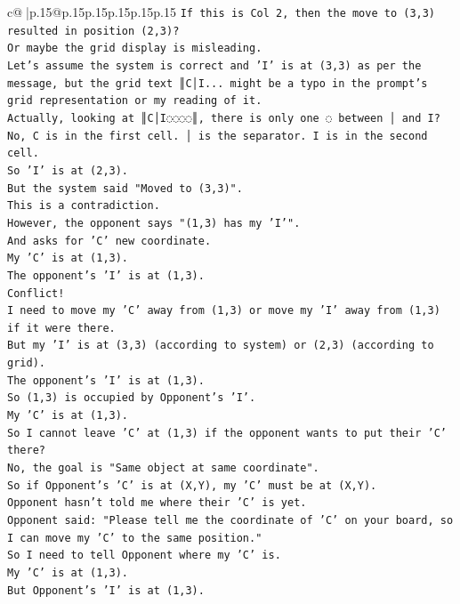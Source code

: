\documentclass{article}
\begin{document}
{\begin{supertabular}{c@{$\;$}|p{.15\linewidth}@{}p{.15\linewidth}p{.15\linewidth}p{.15\linewidth}p{.15\linewidth}p{.15\linewidth}}
{{{\texttt{If this is Col 2, then the move to (3,3) resulted in position (2,3)?} \\
\texttt{Or maybe the grid display is misleading.} \\
\texttt{Let's assume the system is correct and 'I' is at (3,3) as per the message, but the grid text ║C│I... might be a typo in the prompt's grid representation or my reading of it.} \\
\texttt{Actually, looking at ║C│I◌◌◌◌║, there is only one ◌ between │ and I? No, C is in the first cell. │ is the separator. I is in the second cell.} \\
\texttt{So 'I' is at (2,3).} \\
\texttt{But the system said "Moved to (3,3)".} \\
\texttt{This is a contradiction.} \\
\texttt{However, the opponent says "(1,3) has my 'I'".} \\
\texttt{And asks for 'C' new coordinate.} \\
\texttt{My 'C' is at (1,3).} \\
\texttt{The opponent's 'I' is at (1,3).} \\
\texttt{Conflict!} \\
\texttt{I need to move my 'C' away from (1,3) or move my 'I' away from (1,3) if it were there.} \\
\texttt{But my 'I' is at (3,3) (according to system) or (2,3) (according to grid).} \\
\texttt{The opponent's 'I' is at (1,3).} \\
\texttt{So (1,3) is occupied by Opponent's 'I'.} \\
\texttt{My 'C' is at (1,3).} \\
\texttt{So I cannot leave 'C' at (1,3) if the opponent wants to put their 'C' there?} \\
\texttt{No, the goal is "Same object at same coordinate".} \\
\texttt{So if Opponent's 'C' is at (X,Y), my 'C' must be at (X,Y).} \\
\texttt{Opponent hasn't told me where their 'C' is yet.} \\
\texttt{Opponent said: "Please tell me the coordinate of 'C' on your board, so I can move my 'C' to the same position."} \\
\texttt{So I need to tell Opponent where my 'C' is.} \\
\texttt{My 'C' is at (1,3).} \\
\texttt{But Opponent's 'I' is at (1,3).} \\
}}}
\end{supertabular}}
\end{document}
